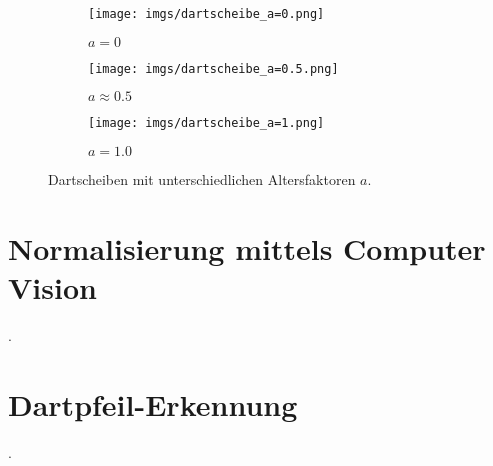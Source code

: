 \begin{figure}
    \centering
    \begin{subfigure}{0.3\textwidth}
        \centering
        \texttt{[image: imgs/dartscheibe\_a=0.png]}
        \caption{$a=0$}
        \label{img:dartscheibe_neu}
    \end{subfigure}
    \hfill
    \begin{subfigure}{0.3\textwidth}
        \centering
        \texttt{[image: imgs/dartscheibe\_a=0.5.png]}
        \caption{$a\approx0.5$}
        \label{img:dartscheibe_mittel}
    \end{subfigure}
    \hfill
    \begin{subfigure}{0.3\textwidth}
        \centering
        \texttt{[image: imgs/dartscheibe\_a=1.png]}
        \caption{$a=1.0$}
        \label{img:dartscheibe_alt}
    \end{subfigure}
    \caption{Dartscheiben mit unterschiedlichen Altersfaktoren $a$.}
    \label{img:dartscheiben}
\end{figure}

\section{Normalisierung mittels Computer Vision}
\label{sec:met:cv}

.

\section{Dartpfeil-Erkennung}
\label{sec:met:ai}

.
